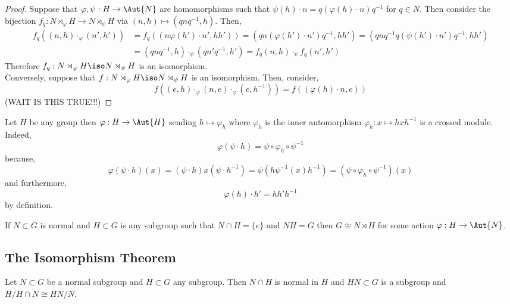 \documentclass[12pt]{article}
\begin{document}
\begin{proof}
Suppose that $\varphi, \psi : H \to \Aut{N}$ are homomorphisms such that $\psi(h) \cdot n = q (\varphi(h) \cdot n) q^{-1}$ for $q \in N$. Then consider the bijection $f_q : N \rtimes_\varphi H \to N \rtimes_\psi H$ via $(n, h) \mapsto (q n q^{-1}, h)$. Then,
\begin{align*}
f_q((n, h) \cdot_\varphi (n', h')) & = f_q((n \varphi(h') \cdot n', h h')) = (q n (\varphi(h') \cdot n') q^{-1}, h h') = (q n q^{-1} q(\psi(h') \cdot n')q^{-1}, hh') 
\\
& = (q n q^{-1}, h) \cdot_\psi (q n' q^{-1}, h') = f_q(n, h) \cdot_\psi f_q(n', h')
\end{align*}
Therefore $f_q : N \rtimes_\varphi H \iso N \rtimes_\psi H$ is an isomorphism.
\bigskip\\
Conversely, suppose that $f : N \rtimes_\varphi H \iso N \rtimes_\psi H$ is an isomorphism. Then, consider,
\[ f((e, h) \cdot_\varphi (n, e) \cdot_\varphi (e, h^{-1})) = f((\varphi(h) \cdot n, e)) \] 
(WAIT IS THIS TRUE!!!)
\end{proof}

\begin{rmk}
Let $H$ be any group then $\varphi : H \to \Aut{H}$ sending $h \mapsto \varphi_h$ where $\varphi_h$ is the inner automorphism $\varphi_h : x \mapsto h x h^{-1}$ is a crossed module. Indeed,
\[ \varphi(\psi \cdot h) = \psi \circ \varphi_h \circ \psi^{-1} \]
because,
\[ \varphi(\psi \cdot h)(x) = (\psi \cdot h) x (\psi \cdot h^{-1}) = \psi(h \psi^{-1}(x) h^{-1}) = (\psi \circ \varphi_h \circ \psi^{-1})(x) \]
and furthermore,
\[ \varphi(h) \cdot h' = h h' h^{-1} \]
by definition.
\end{rmk}

\begin{prop}
If $N \subset G$ is normal and $H \subset G$ is any subgroup such that $N \cap H = \{ e \}$ and $NH = G$ then $G \cong N \rtimes H$ for some action $\varphi : H \to \Aut{N}$.
\end{prop}

\subsection{The Isomorphism Theorem}

\begin{thm}
Let $N \subset G$ be a normal subgroup and $H \subset G$ any subgroup. Then $N \cap H$ is normal in $H$ and $HN \subset G$ is a subgroup and $H/H \cap N \cong HN/N$.
\end{thm}
\end{document}
